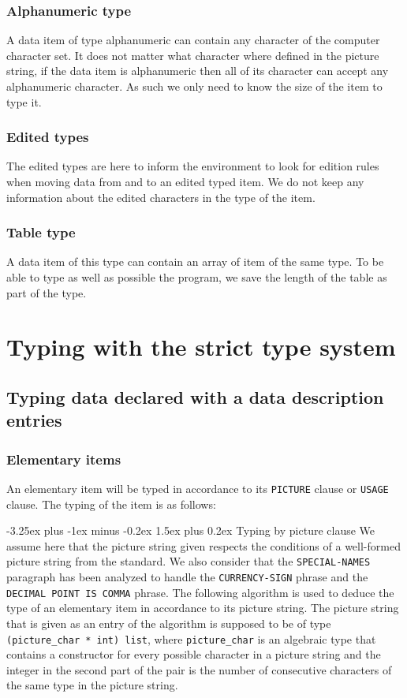 \documentclass[a4paper,10pt]{article}
\makeatletter
\renewcommand{\paragraph}{\@startsection{paragraph}{4}{0ex}%
  {-3.25ex plus -1ex minus -0.2ex}%
  {1.5ex plus 0.2ex}%
{\normalfont\normalsize\bfseries}}
\newcommand{\ocamli}[1]{\texttt{#1}}
\newcommand{\coboli}[1]{\texttt{#1}}
\newcommand{\usagec}[1]{\texttt{USAGE} clause#1}
\newcommand{\picturec}[1]{\texttt{PICTURE} clause#1}
\makeatother
\begin{document}
\subsubsection{Alphanumeric type}
A data item of type alphanumeric can contain any character of the computer character set. It does
not matter what character where defined in the picture string, if the data item is alphanumeric
then all of its character can accept any alphanumeric character. As such we only need to know
the size of the item to type it.

\subsubsection{Edited types}
The edited types are here to inform the environment to look for edition rules when moving data
from and to an edited typed item. We do not keep any information about the edited characters in
the type of the item.

\subsubsection{Table type}
A data item of this type can contain an array of item of the same type. To be able to type as
well as possible the program, we save the length of the table as part of the type.

\pagebreak

\section{Typing with the strict type system}
\subsection{Typing data declared with a data description entries}
\subsubsection{Elementary items}\label{sec:strict_elementary}
An elementary item will be typed in accordance to its \picturec{} or \usagec{}.
The typing of the item is as follows:

\paragraph{Typing by picture clause}
We assume here that the picture string given respects the conditions of a well-formed picture
string from the standard. We also consider that the \coboli{SPECIAL-NAMES} paragraph has been analyzed
to handle the \coboli{CURRENCY-SIGN} phrase and the \coboli{DECIMAL POINT IS COMMA} phrase.
The following algorithm is used to deduce the type of an elementary item in accordance to
its picture string. The picture string that is given as an entry of the algorithm is supposed to
be of type \texttt{(picture_char * int) list}, where \ocamli{picture_char} is an algebraic
type that contains a constructor for every possible character in a picture string and the integer
in the second part of the pair is the number of consecutive characters of the same type in
the picture string.
\end{document}
